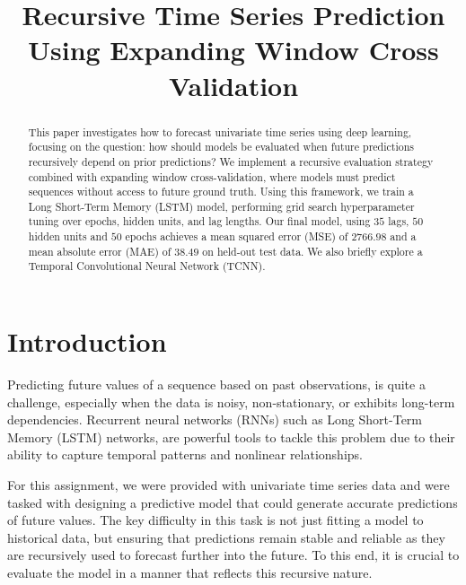 \documentclass[conference]{IEEEtran}
\begin{document}
\title{Recursive Time Series Prediction Using Expanding Window Cross Validation\\}

\author{
\and
{}
\and
{}
\and
{}
}

\maketitle

\begin{abstract}
    This paper investigates how to forecast univariate time series using deep learning, 
    focusing on the question: how should models be evaluated when future predictions recursively 
    depend on prior predictions? We implement a recursive evaluation strategy combined with 
    expanding window cross-validation, where models must predict sequences without access to 
    future ground truth. Using this framework, we train a Long Short-Term Memory (LSTM) model, 
    performing grid search hyperparameter tuning over epochs, hidden units, and lag lengths. 
    Our final model, using $35$ lags, $50$ hidden units and $50$ epochs achieves a mean 
    squared error (MSE) of $2766.98$ and a mean absolute error (MAE) of $38.49$ on held-out test data. 
    We also briefly explore a Temporal Convolutional Neural Network (TCNN).
\end{abstract}

\section{Introduction}
Predicting future values of a sequence based on past observations, is quite a challenge,
especially when the data is noisy, non-stationary, or exhibits long-term dependencies. Recurrent 
neural networks (RNNs) such as Long Short-Term Memory (LSTM) networks, are powerful tools to 
tackle this problem due to their ability to capture temporal patterns and nonlinear relationships.

For this assignment, we were provided with univariate time series data and were tasked with 
designing a predictive model that could generate accurate predictions of future values. The key 
difficulty in this task is not just fitting a model to historical data, but ensuring that 
predictions remain stable and reliable as they are recursively used to forecast further into the 
future. To this end, it is crucial to evaluate the model in a manner that reflects this recursive 
nature.
\end{document}
